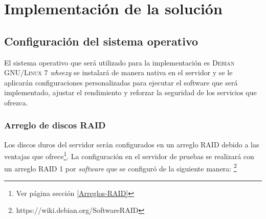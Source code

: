 {
  \linespread{1}
  \cleardoublepage  
  \chapter{Implementaci\'{o}n de la soluci\'{o}n}
  \label{chap:cap3}
}

    \section {Configuraci\'{o}n del sistema operativo}

El sistema operativo que ser\'{a} utilizado para la implementaci\'{o}n es \textsc{Debian GNU/Linux} 7 \textit{\guillemotleft wheezy\guillemotright} se instalar\'{a} de manera nativa en el servidor y se le aplicar\'{a}n configuraciones personalizadas para ejecutar el software que ser\'{a} implementado, ajustar el rendimiento y reforzar la seguridad de los servicios que ofrezca.

      \subsection {Arreglo de discos \textsc{RAID}}

Los discos duros del servidor ser\'{a}n configurados en un arreglo \textsc{RAID} debido a las ventajas que ofrece\footnote{Ver p\'{a}gina \pageref{Arreglos-RAID} secci\'{o}n \ref{Arreglos-RAID}}. La configuraci\'{o}n en el servidor de pruebas se realizar\'{a} con un arreglo \textsc{RAID} 1 por \textit{software} que se configur\'{o} de la siguiente manera: \footnote{https://wiki.debian.org/SoftwareRAID}

